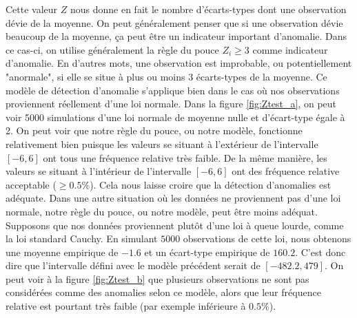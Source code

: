 Cette valeur $Z$ nous donne en fait le nombre d'écarts-types dont une observation dévie de la moyenne. On peut généralement penser que si une observation dévie beaucoup de la moyenne, ça peut être un indicateur important d'anomalie. Dans ce cas-ci, on utilise généralement la règle du pouce $Z_i \ge 3$ comme indicateur d'anomalie. En d'autres mots, une observation est improbable, ou potentiellement "anormale", si elle se situe à plus ou moins 3 écarts-types de la moyenne. Ce modèle de détection d'anomalie s'applique bien dans le cas où nos observations proviennent réellement d'une loi normale. Dans la figure \ref{fig:Ztest_a}, on peut voir 5000 simulations d'une loi normale de moyenne nulle et d'écart-type égale à 2. On peut voir que notre règle du pouce, ou notre modèle, fonctionne relativement bien puisque les valeurs se situant à l'extérieur de l'intervalle $[-6, 6]$ ont tous une fréquence relative très faible. De la même manière, les valeurs se situant à l'intérieur de l'intervalle $[-6, 6]$ ont des fréquence relative acceptable ($\ge 0.5\%$). Cela nous laisse croire que la détection d'anomalies est adéquate. Dans une autre situation où les données ne proviennent pas d'une loi normale, notre règle du pouce, ou notre modèle, peut être moins adéquat. Supposons que nos données proviennent plutôt d'une loi à queue lourde, comme la loi standard Cauchy. En simulant $5000$ observations de cette loi, nous obtenons une moyenne empirique de $-1.6$ et un écart-type empirique de $160.2$. C'est donc dire que l'intervalle défini avec le modèle précédent serait de $[-482.2, 479]$. On peut voir à la figure \ref{fig:Ztest_b} que plusieurs observations ne sont pas considérées comme des anomalies selon ce modèle, alors que leur fréquence relative est pourtant très faible (par exemple inférieure à $0.5\%$). 

